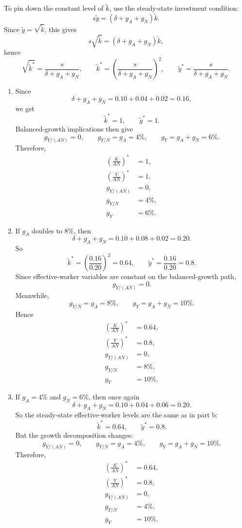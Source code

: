 \documentclass[12pt]{article}
\begin{document}
To pin down the constant level of \(\tilde{k}\), use the steady-state investment condition:
\[
s\tilde{y}=(\delta+g_A+g_N)\tilde{k}.
\]
Since \(\tilde{y}=\sqrt{\tilde{k}}\), this gives
\[
s\sqrt{\tilde{k}}=(\delta+g_A+g_N)\tilde{k},
\]
hence
\[
\sqrt{\tilde{k}^*}=\frac{s}{\delta+g_A+g_N},
\qquad
\tilde{k}^*=\left(\frac{s}{\delta+g_A+g_N}\right)^2,
\qquad
\tilde{y}^*=\frac{s}{\delta+g_A+g_N}.
\]

\begin{enumerate}[label=(\alph*)]
    \item
    Since
    \[
    \delta+g_A+g_N=0.10+0.04+0.02=0.16,
    \]
    we get
    \[
    \tilde{k}^*=1,
    \qquad
    \tilde{y}^*=1.
    \]
    Balanced-growth implications then give
    \[
    g_{Y/(AN)}=0,
    \qquad
    g_{Y/N}=g_A=4\%,
    \qquad
    g_Y=g_A+g_N=6\%.
    \]
    Therefore,
    \[
    \boxed{
    \begin{aligned}
    \left(\frac{K}{AN}\right)^*&=1,\\
    \left(\frac{Y}{AN}\right)^*&=1,\\
    g_{Y/(AN)}&=0,\\
    g_{Y/N}&=4\%,\\
    g_Y&=6\%.
    \end{aligned}}
    \]

    \item
    If \(g_A\) doubles to \(8\%\), then
    \[
    \delta+g_A+g_N=0.10+0.08+0.02=0.20.
    \]
    So
    \[
    \tilde{k}^*=\left(\frac{0.16}{0.20}\right)^2=0.64,
    \qquad
    \tilde{y}^*=\frac{0.16}{0.20}=0.8.
    \]
    Since effective-worker variables are constant on the balanced-growth path,
    \[
    g_{Y/(AN)}=0.
    \]
    Meanwhile,
    \[
    g_{Y/N}=g_A=8\%,
    \qquad
    g_Y=g_A+g_N=10\%.
    \]
    Hence
    \[
    \boxed{
    \begin{aligned}
    \left(\frac{K}{AN}\right)^*&=0.64,\\
    \left(\frac{Y}{AN}\right)^*&=0.8,\\
    g_{Y/(AN)}&=0,\\
    g_{Y/N}&=8\%,\\
    g_Y&=10\%.
    \end{aligned}}
    \]

    \item
    If \(g_A=4\%\) and \(g_N=6\%\), then once again
    \[
    \delta+g_A+g_N=0.10+0.04+0.06=0.20.
    \]
    So the steady-state effective-worker levels are the same as in part b:
    \[
    \tilde{k}^*=0.64,
    \qquad
    \tilde{y}^*=0.8.
    \]
    But the growth decomposition changes:
    \[
    g_{Y/(AN)}=0,
    \qquad
    g_{Y/N}=g_A=4\%,
    \qquad
    g_Y=g_A+g_N=10\%.
    \]
    Therefore,
    \[
    \boxed{
    \begin{aligned}
    \left(\frac{K}{AN}\right)^*&=0.64,\\
    \left(\frac{Y}{AN}\right)^*&=0.8,\\
    g_{Y/(AN)}&=0,\\
    g_{Y/N}&=4\%,\\
    g_Y&=10\%.
    \end{aligned}}
    \]


\end{enumerate}
\end{document}
